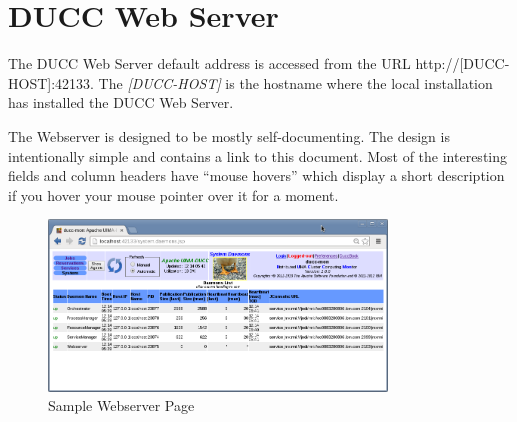 % 
% 
% 
% 
\ifpdf
\else
{}
\fi
\chapter{DUCC Web Server}

    The DUCC Web Server default address is accessed from the URL http://[DUCC-HOST]:42133.  The
    {\em[DUCC-HOST]} is the hostname where the local installation has installed the DUCC
    Web Server.
    
  \begin{center}     
  \end{center}
  
    The Webserver is designed to be mostly self-documenting. The design is intentionally simple 
    and contains a link to this document.  Most of the interesting fields and column headers
    have ``mouse hovers'' which display a short 
    description if you hover your mouse pointer over it for a moment.

\begin{figure}[ht!]
\centering
\includegraphics[width=90mm]{images/ducc-webserver/System-Daemons.png}
\caption{Sample Webserver Page}
\label{overflow}
\end{figure}

